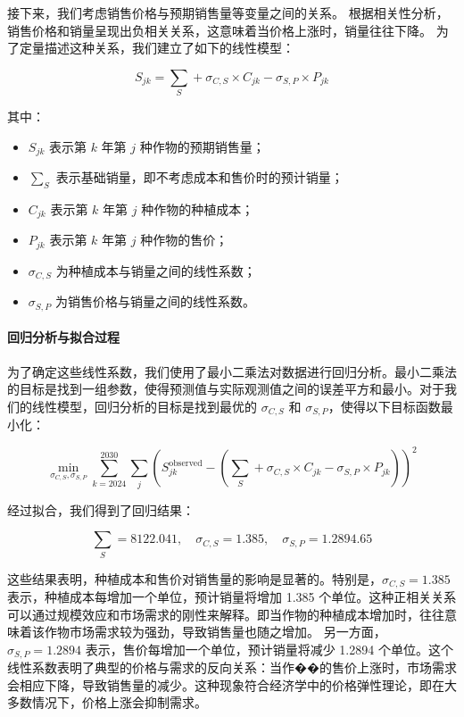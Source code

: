 \documentclass[12pt,a4paper]{nmmcm}
\begin{document}
接下来，我们考虑销售价格与预期销售量等变量之间的关系。
根据相关性分析，销售价格和销量呈现出负相关关系，这意味着当价格上涨时，销量往往下降。
为了定量描述这种关系，我们建立了如下的线性模型：

\[
  S_{jk} = \sum_S + \sigma_{C,S} \times C_{jk} - \sigma_{S,P} \times P_{jk}
\]

其中：
\begin{itemize}
  \item $S_{jk}$ 表示第 $k$ 年第 $j$ 种作物的预期销售量；
  \item $\sum_S$ 表示基础销量，即不考虑成本和售价时的预计销量；
  \item $C_{jk}$ 表示第 $k$ 年第 $j$ 种作物的种植成本；
  \item $P_{jk}$ 表示第 $k$ 年第 $j$ 种作物的售价；
  \item $\sigma_{C,S}$ 为种植成本与销量之间的线性系数；
  \item $\sigma_{S,P}$ 为销售价格与销量之间的线性系数。
\end{itemize}

\paragraph{回归分析与拟合过程}

为了确定这些线性系数，我们使用了最小二乘法对数据进行回归分析。最小二乘法的目标是找到一组参数，使得预测值与实际观测值之间的误差平方和最小。对于我们的线性模型，回归分析的目标是找到最优的 $\sigma_{C,S}$ 和 $\sigma_{S,P}$，使得以下目标函数最小化：

\[
  \min_{\sigma_{C,S}, \sigma_{S,P}} \sum_{k=2024}^{2030} \sum_{j} \left( S_{jk}^{\text{observed}} - \left( \sum_S + \sigma_{C,S} \times C_{jk} - \sigma_{S,P} \times P_{jk} \right) \right)^2
\]

经过拟合，我们得到了回归结果：

\[
  \sum_S = 8122.041, \quad \sigma_{C,S} = 1.385, \quad \sigma_{S,P} = 1.2894.65
\]


这些结果表明，种植成本和售价对销售量的影响是显著的。特别是，$\sigma_{C,S} = 1.385$ 表示，种植成本每增加一个单位，预计销量将增加 1.385 个单位。这种正相关关系可以通过规模效应和市场需求的刚性来解释。即当作物的种植成本增加时，往往意味着该作物市场需求较为强劲，导致销售量也随之增加。
另一方面，$\sigma_{S,P} = 1.2894$ 表示，售价每增加一个单位，预计销量将减少 1.2894 个单位。这个线性系数表明了典型的价格与需求的反向关系：当作��的售价上涨时，市场需求会相应下降，导致销售量的减少。这种现象符合经济学中的价格弹性理论，即在大多数情况下，价格上涨会抑制需求。
\end{document}
